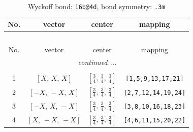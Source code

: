 \documentclass[fleqn,8pt]{jsarticle}
\begin{document}
\renewcommand{\arraystretch}{1.2}
\begin{longtable}{cccc}
\caption{Wyckoff bond: {\tt 16b@4d}, bond symmetry: {\tt .3m}}
 \\
 \hline \hline
No. & vector & center & mapping \\ \hline \endfirsthead

\multicolumn{3}{l}{\tablename\ \thetable{}} \\
 \hline \hline
No. & vector & center & mapping \\ \hline \endhead

 \hline \hline
\multicolumn{3}{r}{\footnotesize\it continued ...} \\ \endfoot

 \hline \hline
\multicolumn{3}{r}{} \\ \endlastfoot

1 & $\left[ X,\, X,\, X \right]$ & $\left[ \frac{3}{4},\, \frac{3}{4},\, \frac{3}{4} \right]$ & {\tt [1,5,9,13,17,21]} \\ \hline
2 & $\left[ - X,\, - X,\, X \right]$ & $\left[ \frac{3}{4},\, \frac{3}{4},\, \frac{3}{4} \right]$ & {\tt [2,7,12,14,19,24]} \\ \hline
3 & $\left[ - X,\, X,\, - X \right]$ & $\left[ \frac{3}{4},\, \frac{3}{4},\, \frac{3}{4} \right]$ & {\tt [3,8,10,16,18,23]} \\ \hline
4 & $\left[ X,\, - X,\, - X \right]$ & $\left[ \frac{3}{4},\, \frac{3}{4},\, \frac{3}{4} \right]$ & {\tt [4,6,11,15,20,22]} \\
\end{longtable}
\renewcommand{\arraystretch}{1.2}
\end{document}
